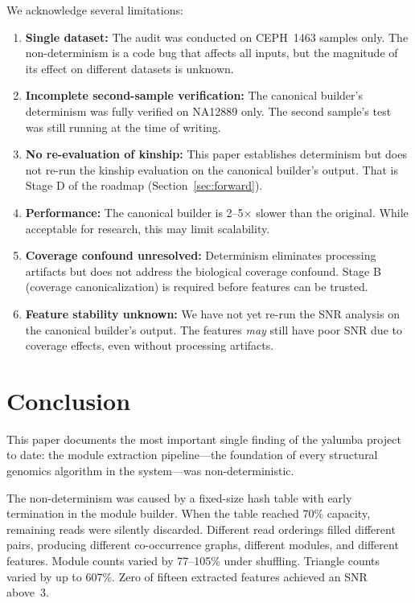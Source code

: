 \documentclass{../yalumba}
\begin{document}
We acknowledge several limitations:

\begin{enumerate}[leftmargin=2em]
  \item \textbf{Single dataset:} The audit was conducted on CEPH~1463 samples
    only. The non-determinism is a code bug that affects all inputs, but the
    magnitude of its effect on different datasets is unknown.
  \item \textbf{Incomplete second-sample verification:} The canonical builder's
    determinism was fully verified on NA12889 only. The second sample's test
    was still running at the time of writing.
  \item \textbf{No re-evaluation of kinship:} This paper establishes
    determinism but does not re-run the kinship evaluation on the canonical
    builder's output. That is Stage D of the roadmap
    (Section~\ref{sec:forward}).
  \item \textbf{Performance:} The canonical builder is 2--5$\times$ slower
    than the original. While acceptable for research, this may limit scalability.
  \item \textbf{Coverage confound unresolved:} Determinism eliminates
    processing artifacts but does not address the biological coverage confound.
    Stage B (coverage canonicalization) is required before features can be
    trusted.
  \item \textbf{Feature stability unknown:} We have not yet re-run the SNR
    analysis on the canonical builder's output. The features \textit{may} still
    have poor SNR due to coverage effects, even without processing artifacts.
\end{enumerate}


\section{Conclusion}
\label{sec:conclusion}

This paper documents the most important single finding of the yalumba project
to date: the module extraction pipeline---the foundation of every structural
genomics algorithm in the system---was non-deterministic.

The non-determinism was caused by a fixed-size hash table with early termination
in the module builder. When the table reached 70\% capacity, remaining reads
were silently discarded. Different read orderings filled different pairs,
producing different co-occurrence graphs, different modules, and different
features. Module counts varied by 77--105\% under shuffling. Triangle counts
varied by up to 607\%. Zero of fifteen extracted features achieved an SNR
above~3.
\end{document}
